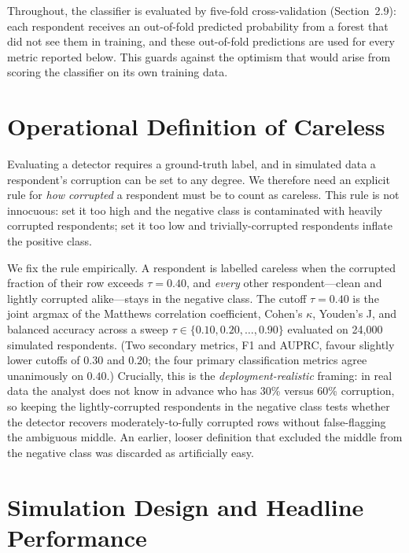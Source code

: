 \documentclass[doc,11pt,donotrepeattitle]{apa7}
\begin{document}
Throughout, the classifier is evaluated by five-fold cross-validation
(Section~2.9): each respondent receives an out-of-fold predicted probability
from a forest that did not see them in training, and these out-of-fold
predictions are used for every metric reported below. This guards against the
optimism that would arise from scoring the classifier on its own training data.

\section{Operational Definition of Careless}

Evaluating a detector requires a ground-truth label, and in simulated data a
respondent's corruption can be set to any degree. We therefore need an explicit
rule for \emph{how corrupted} a respondent must be to count as careless. This
rule is not innocuous: set it too high and the negative class is contaminated
with heavily corrupted respondents; set it too low and trivially-corrupted
respondents inflate the positive class.

We fix the rule empirically. A respondent is labelled careless when the
corrupted fraction of their row exceeds $\tau = 0.40$, and \emph{every} other
respondent---clean and lightly corrupted alike---stays in the negative class.
The cutoff $\tau = 0.40$ is the joint argmax of the Matthews correlation
coefficient, Cohen's $\kappa$, Youden's J, and balanced accuracy across a sweep
$\tau \in \{0.10, 0.20, \dots, 0.90\}$ evaluated on 24{,}000 simulated
respondents. (Two secondary metrics, F1 and AUPRC, favour slightly lower cutoffs
of $0.30$ and $0.20$; the four primary classification metrics agree unanimously
on $0.40$.) Crucially, this is the \emph{deployment-realistic} framing: in real
data the analyst does not know in advance who has 30\% versus 60\% corruption, so
keeping the lightly-corrupted respondents in the negative class tests whether the
detector recovers moderately-to-fully corrupted rows without false-flagging the
ambiguous middle. An earlier, looser definition that excluded the middle from
the negative class was discarded as artificially easy.

\section{Simulation Design and Headline Performance}
\end{document}

